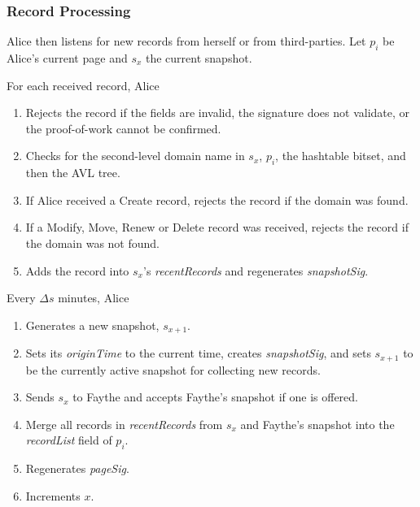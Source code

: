 \subsubsection{Record Processing}




Alice then listens for new records from herself or from third-parties. Let $ p_{i} $ be Alice's current page and $ s_{x} $ the current snapshot.

For each received record, Alice

\begin{enumerate}
	\item Rejects the record if the fields are invalid, the signature does not validate, or the proof-of-work cannot be confirmed.
	\item Checks for the second-level domain name in $ s_{x} $, $ p_{i} $, the hashtable bitset, and then the AVL tree.
	\item If Alice received a Create record, rejects the record if the domain was found.
	\item If a Modify, Move, Renew or Delete record was received, rejects the record if the domain was not found.
	\item Adds the record into $ s_{x} $'s \emph{recentRecords} and regenerates \emph{snapshotSig}.
\end{enumerate}

Every $ \Delta s $ minutes, Alice

\begin{enumerate}
	\item Generates a new snapshot, $ s_{x+1} $.
	\item Sets its \emph{originTime} to the current time, creates \emph{snapshotSig}, and sets $ s_{x+1} $ to be the currently active snapshot for collecting new records.
	\item Sends $ s_{x} $ to Faythe and accepts Faythe's snapshot if one is offered.
	\item Merge all records in \emph{recentRecords} from $ s_{x} $ and Faythe's snapshot into the \emph{recordList} field of $ p_{i} $.
	\item Regenerates \emph{pageSig}.
	\item Increments $ x $.
\end{enumerate}

